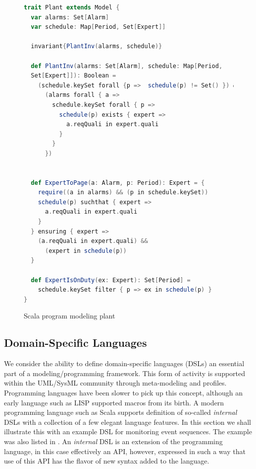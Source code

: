 \begin{figure}
\begin{lstlisting}[language=scala,frame=single]
trait Plant extends Model {
  var alarms: Set[Alarm]
  var schedule: Map[Period, Set[Expert]]

  invariant{PlantInv(alarms, schedule)}

  def PlantInv(alarms: Set[Alarm], schedule: Map[Period, 
  Set[Expert]]): Boolean =
    (schedule.keySet forall {p =>  schedule(p) != Set() }) &&
      (alarms forall { a =>
        schedule.keySet forall { p =>
          schedule(p) exists { expert =>
            a.reqQuali in expert.quali
          }
        }
      })


  def ExpertToPage(a: Alarm, p: Period): Expert = {
    require((a in alarms) && (p in schedule.keySet))
    schedule(p) suchthat { expert =>
      a.reqQuali in expert.quali
    }
  } ensuring { expert =>
    (a.reqQuali in expert.quali) &&
      (expert in schedule(p))
  }

  def ExpertIsOnDuty(ex: Expert): Set[Period] =
    schedule.keySet filter { p => ex in schedule(p) }
}
\end{lstlisting}
\caption{Scala program modeling plant}
\label{fig:plant-scala}
\end{figure}

\subsection{Domain-Specific Languages}
\label{sec:dsl-in-scala}

We consider the ability to define domain-specific languages (DSLs) 
an essential part of a modeling/programming framework. This form of 
activity is supported 
within the UML/SysML community through meta-modeling and profiles. 
Programming languages have been slower to pick up this concept, 
although an early language such as LISP supported macros
from its birth. A modern programming language such as Scala 
supports definition of
so-called {\em internal} DSLs with a collection of a few 
elegant language features. In this section we shall illustrate this 
with an example
DSL for monitoring event sequences. The example was also listed in 
\cite{?}.
An {\em internal} DSL is an extension of the programming language, 
in this case 
effectively an API, however, expressed in such a way that use of 
this API
has the flavor of new syntax added to the language.

